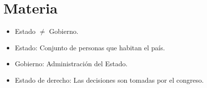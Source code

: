 \documentclass{templateNote}
\begin{document}

\portada
\margenes %

\section{Materia}
\begin{itemize}
    \item Estado $\neq$ Gobierno.
    \item Estado: Conjunto de personas que habitan el país.
    \item Gobierno: Administración del Estado.
    \item Estado de derecho: Las decisiones son tomadas por el congreso.

\end{itemize}
\end{document}
